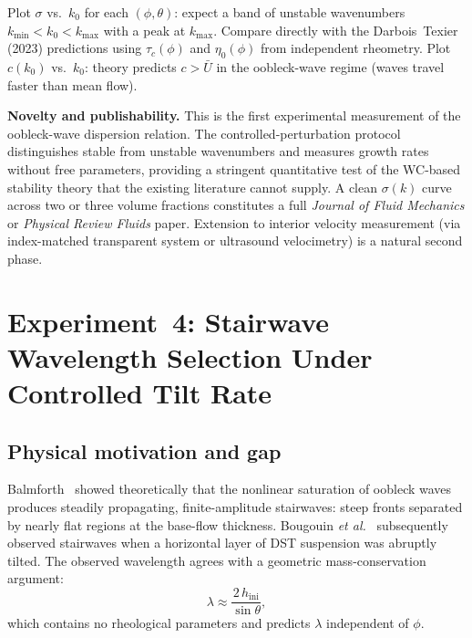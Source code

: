 \documentclass[aps,preprint,superscriptaddress,longbibliography]{revtex4-2}
\newcommand{\tauc}{\tau_c}
\newcommand{\etaz}{\eta_0}
\begin{document}
Plot $\sigma$ vs.\ $k_0$ for each $(\phi, \theta)$: expect a band of unstable
wavenumbers $k_\text{min} < k_0 < k_\text{max}$ with a peak at $k_\text{max}$.
Compare directly with the Darbois~Texier (2023) predictions using
$\tauc(\phi)$ and $\etaz(\phi)$ from independent rheometry.  Plot $c(k_0)$
vs.\ $k_0$: theory predicts $c > \bar{U}$ in the oobleck-wave regime
(waves travel faster than mean flow).

\begin{mdframed}[style=noveltybox]
\textbf{Novelty and publishability.}
This is the first experimental measurement of the oobleck-wave dispersion
relation.  The controlled-perturbation protocol distinguishes stable from
unstable wavenumbers and measures growth rates without free parameters,
providing a stringent quantitative test of the WC-based stability theory that
the existing literature cannot supply.  A clean $\sigma(k)$ curve across two
or three volume fractions constitutes a full \textit{Journal of Fluid Mechanics}
or \textit{Physical Review Fluids} paper.  Extension to interior velocity
measurement (via index-matched transparent system or ultrasound velocimetry)
is a natural second phase.
\end{mdframed}

\section{Experiment~4: Stairwave Wavelength Selection Under Controlled Tilt Rate}
\label{sec:stairwave}

\subsection{Physical motivation and gap}

Balmforth~\cite{Balmforth2025} showed theoretically that the nonlinear
saturation of oobleck waves produces steadily propagating, finite-amplitude
stairwaves: steep fronts separated by nearly flat regions at the base-flow
thickness.  Bougouin \textit{et al.}~\cite{Bougouin2026PRL} subsequently
observed stairwaves when a horizontal layer of DST suspension was abruptly
tilted.  The observed wavelength agrees with a geometric mass-conservation
argument:
\begin{equation}
  \lambda \approx \frac{2\,h_\text{ini}}{\sin\theta},
  \label{eq:lambda_geom}
\end{equation}
which contains no rheological parameters and predicts $\lambda$ independent
of $\phi$.
\end{document}
